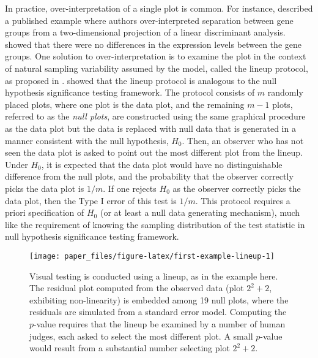 \documentclass[]{interact}
\theoremstyle{plain}%
\theoremstyle{definition}
\theoremstyle{remark}
\begin{document}
In practice, over-interpretation of a single plot is common. For
instance, \citet{roy_chowdhury_using_2015} described a published example
where authors over-interpreted separation between gene groups from a
two-dimensional projection of a linear discriminant analysis.
\citet{roy_chowdhury_using_2015} showed that there were no differences
in the expression levels between the gene groups. One solution to
over-interpretation is to examine the plot in the context of natural
sampling variability assumed by the model, called the lineup protocol,
as proposed in \citet{buja_statistical_2009}.
\citet{majumder_validation_2013} showed that the lineup protocol is
analogous to the null hypothesis significance testing framework. The
protocol consists of \(m\) randomly placed plots, where one plot is the
data plot, and the remaining \(m - 1\) plots, referred to as the
\emph{null plots}, are constructed using the same graphical procedure as
the data plot but the data is replaced with null data that is generated
in a manner consistent with the null hypothesis, \(H_0\). Then, an
observer who has not seen the data plot is asked to point out the most
different plot from the lineup. Under \(H_0\), it is expected that the
data plot would have no distinguishable difference from the null plots,
and the probability that the observer correctly picks the data plot is
\(1/m\). If one rejects \(H_0\) as the observer correctly picks the data
plot, then the Type I error of this test is \(1/m\). This protocol
requires a priori specification of \(H_0\) (or at least a null data
generating mechanism), much like the requirement of knowing the sampling
distribution of the test statistic in null hypothesis significance
testing framework.

\begin{figure}[t!]

{\centering \texttt{[image: paper\_files/figure-latex/first-example-lineup-1]} 

}

\caption{Visual testing is conducted using a lineup, as in the example here. The residual plot computed from the observed data (plot $2^2 + 2$, exhibiting non-linearity) is embedded among 19 null plots, where the residuals are simulated from a standard error model. Computing the $p$-value requires that the lineup be examined by a number of human judges, each asked to select the most different plot. A small $p$-value would result from a substantial number selecting plot $2^2 + 2$.}\label{fig:first-example-lineup}
\end{figure}
\end{document}
